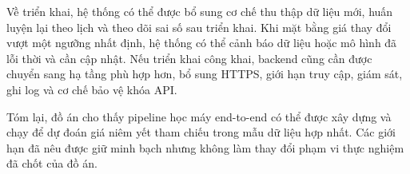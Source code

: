 Về triển khai, hệ thống có thể được bổ sung cơ chế thu thập dữ liệu mới, huấn luyện lại theo lịch và theo dõi sai số sau triển khai. Khi mặt bằng giá thay đổi vượt một ngưỡng nhất định, hệ thống có thể cảnh báo dữ liệu hoặc mô hình đã lỗi thời và cần cập nhật. Nếu triển khai công khai, backend cũng cần được chuyển sang hạ tầng phù hợp hơn, bổ sung HTTPS, giới hạn truy cập, giám sát, ghi log và cơ chế bảo vệ khóa API.

Tóm lại, đồ án cho thấy pipeline học máy end-to-end có thể được xây dựng và chạy để dự đoán giá niêm yết tham chiếu trong mẫu dữ liệu hợp nhất. Các giới hạn đã nêu được giữ minh bạch nhưng không làm thay đổi phạm vi thực nghiệm đã chốt của đồ án.
